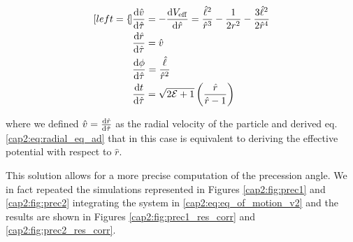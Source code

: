 \begin{subequations}
    \begin{align}[left = {\empheqlbrace}]
        &\dv{\hat v}{\hat \tau} = - \dv{V_{\rm eff}}{\hat r} 
        = \frac{\hat \ell^2}{\hat r^3} - \frac{1}{2 r^2}
        - \frac{3 \hat \ell^2}{2 \hat r^4} \label{cap2:eq:acc_eq_ad} \\
        &\dv{\hat r}{\hat \tau} = \hat v \\
        &\dv{\phi}{\hat \tau} = \frac{\hat \ell}{\hat r^2} \\
        &\dv{t}{\hat \tau} = \sqrt{2 \mathcal E + 1}
        \left(\frac{\hat r}{\hat r - 1}\right)
        \label{cap2:eq:t_ad_v2}
    \end{align}
    \label{cap2:eq:eq_of_motion_v2}
\end{subequations}

where we defined $\hat v = \dv{\hat r}{\hat \tau}$ as the radial velocity of the
particle and derived eq. \ref{cap2:eq:radial_eq_ad} that in this case is
equivalent to deriving the effective potential with respect to $\hat r$.

This solution allows for a more precise computation of the precession angle.
We in fact repeated the simulations represented in Figures 
\ref{cap2:fig:prec1} and \ref{cap2:fig:prec2} integrating the system in 
\ref{cap2:eq:eq_of_motion_v2} and the results are shown in Figures
\ref{cap2:fig:prec1_res_corr} and \ref{cap2:fig:prec2_res_corr}.

